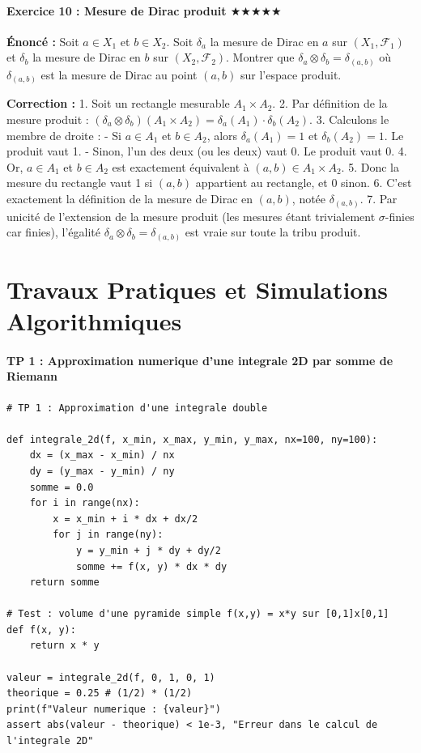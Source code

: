 \documentclass[11pt,a4paper]{article}
\begin{document}
\subsection*{Exercice 10 : Mesure de Dirac produit \quad $\bigstar\bigstar\bigstar\bigstar\bigstar$}

\textbf{Énoncé :}
Soit $a \in X_1$ et $b \in X_2$. Soit $\delta_a$ la mesure de Dirac en $a$ sur $(X_1, \mathcal{F}_1)$ et $\delta_b$ la mesure de Dirac en $b$ sur $(X_2, \mathcal{F}_2)$.
Montrer que $\delta_a \otimes \delta_b = \delta_{(a,b)}$ où $\delta_{(a,b)}$ est la mesure de Dirac au point $(a,b)$ sur l'espace produit.

\textbf{Correction :}
1. Soit un rectangle mesurable $A_1 \times A_2$.
2. Par définition de la mesure produit :
   $(\delta_a \otimes \delta_b)(A_1 \times A_2) = \delta_a(A_1) \cdot \delta_b(A_2)$.
3. Calculons le membre de droite :
   - Si $a \in A_1$ et $b \in A_2$, alors $\delta_a(A_1) = 1$ et $\delta_b(A_2) = 1$. Le produit vaut 1.
   - Sinon, l'un des deux (ou les deux) vaut 0. Le produit vaut 0.
4. Or, $a \in A_1$ et $b \in A_2$ est exactement équivalent à $(a,b) \in A_1 \times A_2$.
5. Donc la mesure du rectangle vaut 1 si $(a,b)$ appartient au rectangle, et 0 sinon.
6. C'est exactement la définition de la mesure de Dirac en $(a,b)$, notée $\delta_{(a,b)}$.
7. Par unicité de l'extension de la mesure produit (les mesures étant trivialement $\sigma$-finies car finies), l'égalité $\delta_a \otimes \delta_b = \delta_{(a,b)}$ est vraie sur toute la tribu produit.

\part{Travaux Pratiques et Simulations Algorithmiques}
\subsection*{TP 1 : Approximation numerique d'une integrale 2D par somme de Riemann}
\begin{lstlisting}
# TP 1 : Approximation d'une integrale double

def integrale_2d(f, x_min, x_max, y_min, y_max, nx=100, ny=100):
    dx = (x_max - x_min) / nx
    dy = (y_max - y_min) / ny
    somme = 0.0
    for i in range(nx):
        x = x_min + i * dx + dx/2
        for j in range(ny):
            y = y_min + j * dy + dy/2
            somme += f(x, y) * dx * dy
    return somme

# Test : volume d'une pyramide simple f(x,y) = x*y sur [0,1]x[0,1]
def f(x, y):
    return x * y

valeur = integrale_2d(f, 0, 1, 0, 1)
theorique = 0.25 # (1/2) * (1/2)
print(f"Valeur numerique : {valeur}")
assert abs(valeur - theorique) < 1e-3, "Erreur dans le calcul de l'integrale 2D"
\end{lstlisting}
\end{document}
